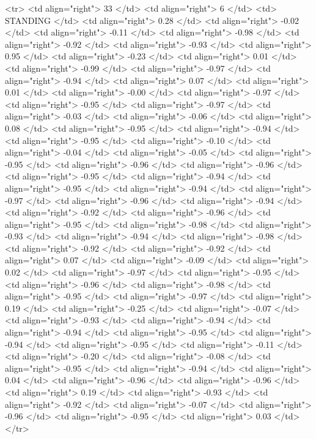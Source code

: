   <tr> <td align="right"> 33 </td> <td align="right">   6 </td> <td> STANDING </td> <td align="right"> 0.28 </td> <td align="right"> -0.02 </td> <td align="right"> -0.11 </td> <td align="right"> -0.98 </td> <td align="right"> -0.92 </td> <td align="right"> -0.93 </td> <td align="right"> 0.95 </td> <td align="right"> -0.23 </td> <td align="right"> 0.01 </td> <td align="right"> -0.99 </td> <td align="right"> -0.97 </td> <td align="right"> -0.94 </td> <td align="right"> 0.07 </td> <td align="right"> 0.01 </td> <td align="right"> -0.00 </td> <td align="right"> -0.97 </td> <td align="right"> -0.95 </td> <td align="right"> -0.97 </td> <td align="right"> -0.03 </td> <td align="right"> -0.06 </td> <td align="right"> 0.08 </td> <td align="right"> -0.95 </td> <td align="right"> -0.94 </td> <td align="right"> -0.95 </td> <td align="right"> -0.10 </td> <td align="right"> -0.04 </td> <td align="right"> -0.05 </td> <td align="right"> -0.95 </td> <td align="right"> -0.96 </td> <td align="right"> -0.96 </td> <td align="right"> -0.95 </td> <td align="right"> -0.94 </td> <td align="right"> -0.95 </td> <td align="right"> -0.94 </td> <td align="right"> -0.97 </td> <td align="right"> -0.96 </td> <td align="right"> -0.94 </td> <td align="right"> -0.92 </td> <td align="right"> -0.96 </td> <td align="right"> -0.95 </td> <td align="right"> -0.98 </td> <td align="right"> -0.93 </td> <td align="right"> -0.94 </td> <td align="right"> -0.98 </td> <td align="right"> -0.92 </td> <td align="right"> -0.92 </td> <td align="right"> 0.07 </td> <td align="right"> -0.09 </td> <td align="right"> 0.02 </td> <td align="right"> -0.97 </td> <td align="right"> -0.95 </td> <td align="right"> -0.96 </td> <td align="right"> -0.98 </td> <td align="right"> -0.95 </td> <td align="right"> -0.97 </td> <td align="right"> 0.19 </td> <td align="right"> -0.25 </td> <td align="right"> -0.07 </td> <td align="right"> -0.93 </td> <td align="right"> -0.94 </td> <td align="right"> -0.94 </td> <td align="right"> -0.95 </td> <td align="right"> -0.94 </td> <td align="right"> -0.95 </td> <td align="right"> -0.11 </td> <td align="right"> -0.20 </td> <td align="right"> -0.08 </td> <td align="right"> -0.95 </td> <td align="right"> -0.94 </td> <td align="right"> 0.04 </td> <td align="right"> -0.96 </td> <td align="right"> -0.96 </td> <td align="right"> 0.19 </td> <td align="right"> -0.93 </td> <td align="right"> -0.92 </td> <td align="right"> -0.07 </td> <td align="right"> -0.96 </td> <td align="right"> -0.95 </td> <td align="right"> 0.03 </td> </tr>
